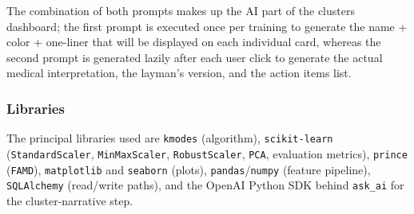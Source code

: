 \noindent The combination of both prompts makes up the AI part of the clusters dashboard; the first prompt is executed once per training to generate the name + color + one-liner that will be displayed on each individual card, whereas the second prompt is generated lazily after each user click to generate the actual medical interpretation, the layman’s version, and the action items list.

\subsubsection*{Libraries}

The principal libraries used are \texttt{kmodes} (algorithm), \texttt{scikit-learn} (\texttt{StandardScaler}, \texttt{MinMaxScaler}, \texttt{RobustScaler}, \texttt{PCA}, evaluation metrics), \texttt{prince} (\texttt{FAMD}), \texttt{matplotlib} and \texttt{seaborn} (plots), \texttt{pandas}/\texttt{numpy} (feature pipeline), \texttt{SQLAlchemy} (read/write paths), and the OpenAI Python SDK behind \texttt{ask\_ai} for the cluster-narrative step.

